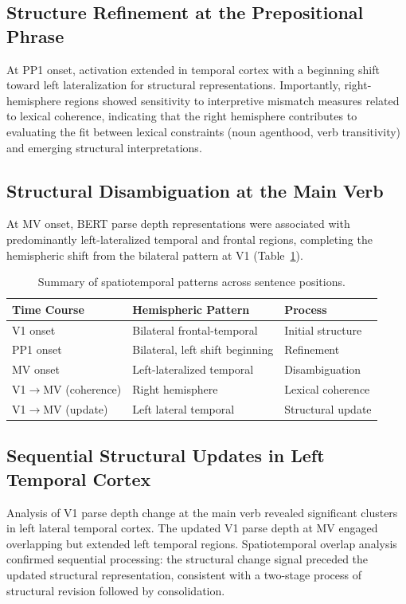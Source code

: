 \documentclass[12pt]{article}
\begin{document}
\subsection{Structure Refinement at the Prepositional Phrase}

At PP1 onset, activation extended in temporal cortex with a beginning shift toward left lateralization for structural representations. Importantly, right-hemisphere regions showed sensitivity to interpretive mismatch measures related to lexical coherence, indicating that the right hemisphere contributes to evaluating the fit between lexical constraints (noun agenthood, verb transitivity) and emerging structural interpretations.

\subsection{Structural Disambiguation at the Main Verb}

At MV onset, BERT parse depth representations were associated with predominantly left-lateralized temporal and frontal regions, completing the hemispheric shift from the bilateral pattern at V1 (Table~\ref{tab:neural}).

\begin{table}[htbp]
\centering
\caption{Summary of spatiotemporal patterns across sentence positions.}
\label{tab:neural}
\begin{tabular}{lll}
\toprule
Time Course & Hemispheric Pattern & Process \\
\midrule
V1 onset & Bilateral frontal-temporal & Initial structure \\
PP1 onset & Bilateral, left shift beginning & Refinement \\
MV onset & Left-lateralized temporal & Disambiguation \\
V1$\to$MV (coherence) & Right hemisphere & Lexical coherence \\
V1$\to$MV (update) & Left lateral temporal & Structural update \\
\bottomrule
\end{tabular}
\end{table}

\subsection{Sequential Structural Updates in Left Temporal Cortex}

Analysis of V1 parse depth change at the main verb revealed significant clusters in left lateral temporal cortex. The updated V1 parse depth at MV engaged overlapping but extended left temporal regions. Spatiotemporal overlap analysis confirmed sequential processing: the structural change signal preceded the updated structural representation, consistent with a two-stage process of structural revision followed by consolidation.
\end{document}

